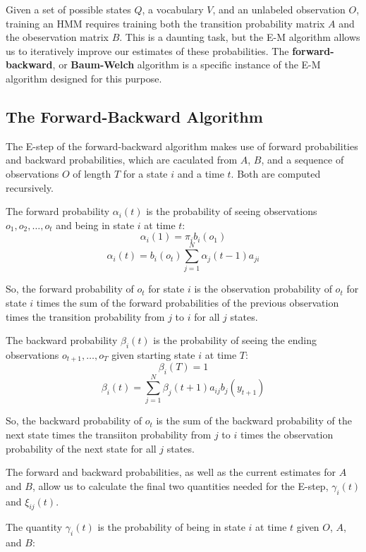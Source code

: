 \documentclass[14pt]{article}
\begin{document}
Given a set of possible states $Q$, a vocabulary $V$, and an unlabeled observation $O$, training an HMM requires training both the transition probability matrix $A$ and the obeservation matrix $B$.  This is a daunting task, but the E-M algorithm allows us to iteratively improve our estimates of these probabilities.  The \textbf{forward-backward}, or \textbf{Baum-Welch} algorithm is a specific instance of the E-M algorithm designed for this purpose.

\begin{center}
\subsection*{The Forward-Backward Algorithm}
\end{center}

The E-step of the forward-backward algorithm makes use of forward probabilities and backward probabilities, which are caculated from $A$, $B$, and a sequence of observations $O$ of length $T$ for a state $i$ and a time $t$.  Both are computed recursively.

The forward probability $\alpha_i(t)$ is the probability of seeing observations $o_1,o_2,\ldots,o_t$ and being in state $i$ at time $t$:
$$\alpha_i(1) = \pi_ib_i(o_1)$$
$$\alpha_i(t) = b_i(o_t)\sum_{j=1}^N \alpha_j(t-1)a_{ji}$$

So, the forward probability of $o_t$ for state $i$ is the observation probability of $o_t$ for state $i$ times the sum of the forward probabilities of the previous observation times the transition probability from $j$ to $i$ for all $j$ states.

The backward probability $\beta_i(t)$ is the probability of seeing the ending observations $o_{t+1},\ldots,o_T$ given starting state $i$ at time $T$:
$$\beta_i(T) = 1$$
$$\beta_i(t) = \sum_{j=1}^N \beta_j(t+1)a_{ij}b_j(y_{t+1})$$

So, the backward probability of $o_t$ is the sum of the backward probability of the next state times the transiiton probability from $j$ to $i$ times the observation probability of the next state for all $j$ states.

The forward and backward probabilities, as well as the current estimates for $A$ and $B$, allow us to calculate the final two quantities needed for the E-step, $\gamma_i(t)$ and $\xi_{ij}(t)$.

The quantity $\gamma_i(t)$ is the probability of being in state $i$ at time $t$ given $O$, $A$, and $B$:
\end{document}
